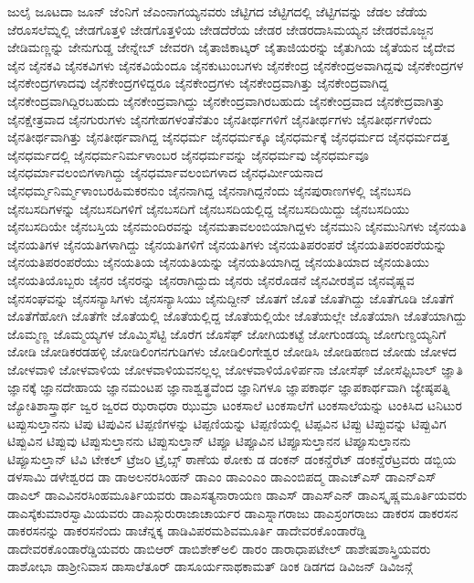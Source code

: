 {ಜುಲೈ
ಜೂಟದಾ
ಜೂನ್
ಜೆಂನಿಗೆ
ಜೆಎಂನಾಗಯ್ಯನವರು
ಜೆಟ್ಟಿಗದ
ಜೆಟ್ಟಿಗದಲ್ಲಿ
ಜೆಟ್ಟಿಗವನ್ನು
ಜೆಡಲ
ಜೆಡೆಯ
ಜೆರೂಸಲೆಮ್ನಲ್ಲಿ
ಜೇಡಗೊತ್ತಳಿ
ಜೇಡಗೊತ್ತಳಿಯ
ಜೇಡದೆರೆಯ
ಜೇಡರ
ಜೇಡರದಾಸಿಮಯ್ಯನ
ಜೇಡರಮೊಜ್ಜನ
ಜೇಡಿಮಣ್ಣನ್ನು
ಜೇನುಗುಡ್ಡ
ಜೇನ್ನೇಬ್
ಜೇವರಗಿ
ಜೈತಾಜಿಕಾಟ್ಕರ್
ಜೈತಾಜಿಯರನ್ನು
ಜೈತುಗಿಯ
ಜೈತೆಯನ
ಜೈದೇವ
ಜೈನ
ಜೈನಕವಿ
ಜೈನಕವಿಗಳು
ಜೈನಕವಿಯೆಂದೂ
ಜೈನಕುಟುಂಬಗಳು
ಜೈನಕೇಂದ್ರ
ಜೈನಕೇಂದ್ರಅವಾಗಿದ್ದವು
ಜೈನಕೇಂದ್ರಗಳ
ಜೈನಕೇಂದ್ರಗಳಾದವು
ಜೈನಕೇಂದ್ರಗಳಿದ್ದರೂ
ಜೈನಕೇಂದ್ರಗಳು
ಜೈನಕೇಂದ್ರವಾಗಿತ್ತು
ಜೈನಕೇಂದ್ರವಾಗಿದ್ದ
ಜೈನಕೇಂದ್ರವಾಗಿದ್ದಿರಬಹುದು
ಜೈನಕೇಂದ್ರವಾಗಿದ್ದು
ಜೈನಕೇಂದ್ರವಾಗಿರಬಹುದು
ಜೈನಕೇಂದ್ರವಾದ
ಜೈನಕೇದ್ರವಾಗಿತ್ತು
ಜೈನಕ್ಷೇತ್ರವಾದ
ಜೈನಗುರುಗಳು
ಜೈನಗೇಹಗಳಂತೆನೆತುಂ
ಜೈನತೀರ್ಥಗಳಿಗೆ
ಜೈನತೀರ್ಥಗಳು
ಜೈನತೀರ್ಥಗಳೆಂದು
ಜೈನತೀರ್ಥವಾಗಿತ್ತು
ಜೈನತೀರ್ಥವಾಗಿದ್ದ
ಜೈನಧರ್ಮ
ಜೈನಧರ್ಮಕ್ಕೂ
ಜೈನಧರ್ಮಕ್ಕೆ
ಜೈನಧರ್ಮದ
ಜೈನಧರ್ಮದತ್ತ
ಜೈನಧರ್ಮದಲ್ಲಿ
ಜೈನಧರ್ಮನಿರ್ಮಳಾಂಬರ
ಜೈನಧರ್ಮವನ್ನು
ಜೈನಧರ್ಮವು
ಜೈನಧರ್ಮವೂ
ಜೈನಧರ್ಮಾವಲಂಬಿಗಳಾಗಿದ್ದು
ಜೈನಧರ್ಮಾವಲಂಬಿಗಳಾದ
ಜೈನಧರ್ಮೀಯನಾದ
ಜೈನಧರ್ಮ್ಮನಿರ್ಮ್ಮಳಾಂಬರಹಿಮಕರನುಂ
ಜೈನನಾಗಿದ್ದ
ಜೈನನಾಗಿದ್ದನೆಂದು
ಜೈನಪುರಾಣಗಳಲ್ಲಿ
ಜೈನಬಸದಿ
ಜೈನಬಸದಿಗಳನ್ನು
ಜೈನಬಸದಿಗಳಿಗೆ
ಜೈನಬಸದಿಗೆ
ಜೈನಬಸದಿಯಲ್ಲಿದ್ದ
ಜೈನಬಸದಿಯಿದ್ದು
ಜೈನಬಸದಿಯು
ಜೈನಬಸದಿಯೇ
ಜೈನಬಸ್ತಿಯ
ಜೈನಮಂದಿರವನ್ನು
ಜೈನಮತಾವಲಂಬಿಯಾಗಿದ್ದಳು
ಜೈನಮುನಿ
ಜೈನಮುನಿಗಳು
ಜೈನಯತಿ
ಜೈನಯತಿಗಳ
ಜೈನಯತಿಗಳಾಗಿದ್ದು
ಜೈನಯತಿಗಳಿಗೆ
ಜೈನಯತಿಗಳು
ಜೈನಯತಿಪರಂಪರೆ
ಜೈನಯತಿಪರಂಪರೆಯನ್ನು
ಜೈನಯತಿಪರಂಪರೆಯು
ಜೈನಯತಿಯ
ಜೈನಯತಿಯನ್ನು
ಜೈನಯತಿಯಾಗಿದ್ದ
ಜೈನಯತಿಯಾದ
ಜೈನಯತಿಯು
ಜೈನಯತಿಯೊಬ್ಬರು
ಜೈನರ
ಜೈನರನ್ನು
ಜೈನರಾಗಿದ್ದುದು
ಜೈನರು
ಜೈನರೊಡನೆ
ಜೈನವೀರಶೈವ
ಜೈನವೈಷ್ಣವ
ಜೈನಸಂಘವನ್ನು
ಜೈನಸನ್ಯಾಸಿಗಳು
ಜೈನಸನ್ಯಾಸಿಯು
ಜೈನುದ್ದೀನ್
ಜೊತಗೆ
ಜೊತೆ
ಜೊತೆಗಿದ್ದು
ಜೊತೆಗೂಡಿ
ಜೊತೆಗೆ
ಜೊತೆಗೆಹೋಗಿ
ಜೊತೆಗೇ
ಜೊತೆಯಲ್ಲಿ
ಜೊತೆಯಲ್ಲಿದ್ದ
ಜೊತೆಯಲ್ಲಿಯೇ
ಜೊತೆಯಲ್ಲೇ
ಜೊತೆಯಾಗಿ
ಜೊತೆಯಾಗಿದ್ದು
ಜೊಮ್ಮಣ್ಣ
ಜೊಮ್ಮಯ್ಯಗಳ
ಜೊಮ್ಮಿಸೆಟ್ಟಿ
ಜೊರೆಗ
ಜೊಸೆಫ್
ಜೋಗಿಯಕಟ್ಟೆ
ಜೋಗುಂಡಯ್ಯ
ಜೋಗುಣ್ಡಯ್ಯನಿಗೆ
ಜೋಡಿ
ಜೋಡಿಕರಡಹಳ್ಳಿ
ಜೋಡಿಲಿಂಗನಗುಡಿಗಳು
ಜೋಡಿಲಿಂಗೇಶ್ವರ
ಜೋಡಿಸಿ
ಜೋಡಿಹಣದ
ಜೋಡು
ಜೋಳದ
ಜೋಳವಾಳಿ
ಜೋಳವಾಳಿಯ
ಜೋಳವಾಳಿಯವನಲ್ಲಲ್ಲ
ಜೋಳವಾಳಿಯೊಳಿರ್ಪನಾ
ಜೋಸೆಫ್
ಜೋಸೆಫ್ಸಿಬಾಲ್
ಜ್ಞಾತಿ
ಜ್ಞಾನಕ್ಕೆ
ಜ್ಞಾನದೇಹಾಯ
ಜ್ಞಾನಮಂಟಪ
ಜ್ಞಾನಾಶ್ವತ್ಥವೆಂದ
ಜ್ಞಾನಿಗಳೂ
ಜ್ಞಾಪಕಾರ್ಥ
ಜ್ಞಾಪಕಾರ್ಥವಾಗಿ
ಜ್ಯೇಷ್ಠಪತ್ನಿ
ಜ್ಯೋತಿಶಾಸ್ತ್ರಾರ್ಥ
ಜ್ವರ
ಜ್ವರದ
ಝರಾಧರಾ
ಝುಮ್ರಾ
ಟಂಕಸಾಲೆ
ಟಂಕಸಾಲೆಗೆ
ಟಂಕಸಾಲೆಯನ್ನು
ಟಂಕಿಸಿದ
ಟನಿಟುರ
ಟಪ್ಪುಸುಲ್ತಾನನು
ಟಿಪು
ಟಿಪುವಿನ
ಟಿಪ್ಪಣಿಗಳನ್ನು
ಟಿಪ್ಪಣಿಯನ್ನು
ಟಿಪ್ಪಣಿಯಲ್ಲಿ
ಟಿಪ್ಪವಿನ
ಟಿಪ್ಪು
ಟಿಪ್ಪುವನ್ನು
ಟಿಪ್ಪುವಿಗ
ಟಿಪ್ಪುವಿನ
ಟಿಪ್ಪುವು
ಟಿಪ್ಪುಸುಲ್ತಾನನು
ಟಿಪ್ಪುಸುಲ್ತಾನ್
ಟಿಪ್ಪೂ
ಟಿಪ್ಪೂವಿನ
ಟಿಪ್ಪೂಸುಲ್ತಾನನ
ಟಿಪ್ಪೂಸುಲ್ತಾನನು
ಟಿಪ್ಪೂಸುಲ್ತಾನ್
ಟಿವಿ
ಟೇಕಲ್
ಟ್ರೆಜರಿ
ಟ್ರೈಬ್ಸ್
ಠಾಣೆಯ
ಠೋಕು
ಡ
ಡಂಕನ್
ಡಂಕನ್ಡೆರೆಟ್
ಡಂಕನ್ಡೆರೆಟ್ರವರು
ಡಬ್ಬಿಯ
ಡಳಸಾಮಿ
ಡಳೇಶ್ವರದ
ಡಾ
ಡಾಅಲನರಸಿಂಹನ್
ಡಾಎಂ
ಡಾಎಂಎಂ
ಡಾಎಂಬಿಪದ್ಮ
ಡಾಎಚ್ಎಸ್
ಡಾಎನ್ಎಸ್
ಡಾಎಲ್
ಡಾಎವಿನರಸಿಂಹಮೂರ್ತಿಯವರು
ಡಾಎಸತ್ಯನಾರಾಯಣ
ಡಾಎಸ್
ಡಾಎಸ್ಎನ್
ಡಾಎಸ್ಕೃಷ್ಣಮೂರ್ತಿಯವರು
ಡಾಎಸ್ಕೆಕುಮಾರಸ್ವಾಮಿಯವರು
ಡಾಎಸ್ಗುರುರಾಜಾಚಾರ್ಯರ
ಡಾಎಸ್ನಾಗರಾಜು
ಡಾಎಸ್ರಂಗರಾಜು
ಡಾಕರಸ
ಡಾಕರಸನ
ಡಾಕರಸನನ್ನು
ಡಾಕರಸನೆಂದು
ಡಾಚೆನ್ನಕ್ಕ
ಡಾಡಿವಿಪರಮಶಿವಮೂರ್ತಿ
ಡಾದೇವರಕೊಂಡಾರೆಡ್ಡಿ
ಡಾದೇವರಕೊಂಡಾರೆಡ್ಡಿಯವರು
ಡಾಬಿಆರ್
ಡಾಬಿಶೇಕ್ಅಲಿ
ಡಾರಂ
ಡಾರಾಧಾಪಟೇಲ್
ಡಾಶೇಷಶಾಸ್ತ್ರಿಯವರು
ಡಾಶೋಭಾ
ಡಾಶ್ರೀನಿವಾಸ
ಡಾಸಾಲೆತೂರ್
ಡಾಸೂರ್ಯನಾಥಕಾಮತ್
ಡಿಂಕ
ಡಿಡಗದ
ಡಿವಿಜನ್
ಡಿವಿಜನ್ಗೆ
}
